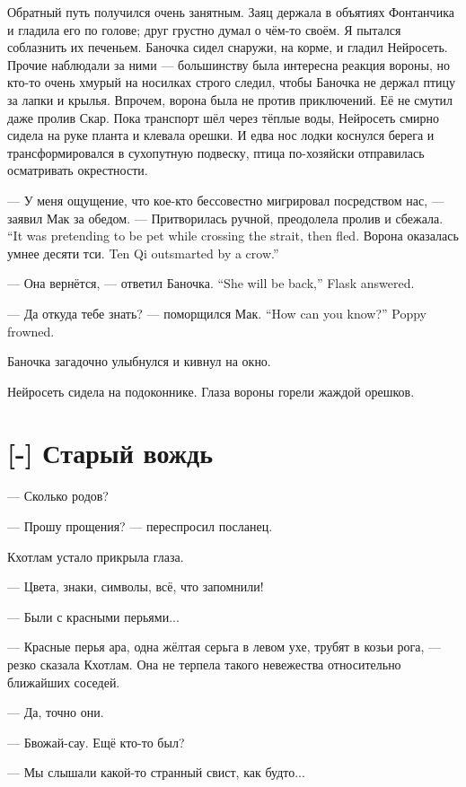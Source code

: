 Обратный путь получился очень занятным.
Заяц держала в объятиях Фонтанчика и гладила его по голове;
друг грустно думал о чём-то своём.
Я пытался соблазнить их печеньем.
Баночка сидел снаружи, на корме, и гладил Нейросеть.
Прочие наблюдали за ними --- большинству была интересна реакция вороны, но кто-то очень хмурый на носилках строго следил, чтобы Баночка не держал птицу за лапки и крылья.
Впрочем, ворона была не против приключений.
Её не смутил даже пролив Скар.
Пока транспорт шёл через тёплые воды, Нейросеть смирно сидела на руке планта и клевала орешки.
И едва нос лодки коснулся берега и трансформировался в сухопутную подвеску, птица по-хозяйски отправилась осматривать окрестности.

--- У меня ощущение, что кое-кто бессовестно мигрировал посредством нас, --- заявил Мак за обедом.
{--- Притворилась ручной, преодолела пролив и сбежала.}
{``It was pretending to be pet while crossing the strait, then fled.}
{Ворона оказалась умнее десяти тси.}
{Ten Qi outsmarted by a crow.''}

{--- Она вернётся, --- ответил Баночка.}
{``She will be back,'' Flask answered.}

{--- Да откуда тебе знать? --- поморщился Мак.}
{``How can you know?'' Poppy frowned.}

Баночка загадочно улыбнулся и кивнул на окно.

Нейросеть сидела на подоконнике.
Глаза вороны горели жаждой орешков.

\section{[-] Старый вождь}

\textspace

--- Сколько родов?

--- Прошу прощения? --- переспросил посланец.

Кхотлам устало прикрыла глаза.

--- Цвета, знаки, символы, всё, что запомнили!

--- Были с красными перьями...

--- Красные перья ара, одна жёлтая серьга в левом ухе, трубят в козьи рога, --- резко сказала Кхотлам.
Она не терпела такого невежества относительно ближайших соседей.

--- Да, точно они.

--- Бвожай-сау.
Ещё кто-то был?

--- Мы слышали какой-то странный свист, как будто...

